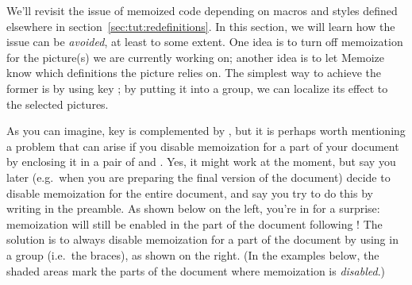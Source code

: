 \documentclass[a4paper,11pt]{article}
\begin{document}
We'll revisit the issue of memoized code depending on macros and styles defined
elsewhere in section~\ref{sec:tut:redefinitions}.  In this section, we will
learn how the issue can be \emph{avoided}, at least to some extent.  One idea
is to turn off memoization for the picture(s) we are currently working on;
another idea is to let Memoize know which definitions the picture relies on.
The simplest way to achieve the former is by using key ;
by putting it into a  group, we can localize its effect to the
selected pictures.


\begin{tcolorbox}[warning]
  As you can imagine, key  is complemented by ,
  but it is perhaps worth mentioning a problem that can arise if you disable
  memoization for a part of your document by enclosing it in a pair of
   and
  .  Yes, it might work at the moment,
  but say you later (e.g.\ when you are preparing the final version of the
  document) decide to disable memoization for the entire document, and say you
  try to do this by writing  in the
  preamble.  As shown below on the left, you're in for a surprise: memoization
  will still be enabled in the part of the document following
  !  The solution is to always disable
  memoization for a part of the document by using
   in a  group (i.e.\ the
  braces), as shown on the right.  (In the examples below, the shaded areas
  mark the parts of the document where memoization is \emph{disabled}.)
\end{tcolorbox}

\begin{tcbraster}[raster columns=2, raster equal height=rows]
\end{tcbraster}
\end{document}
